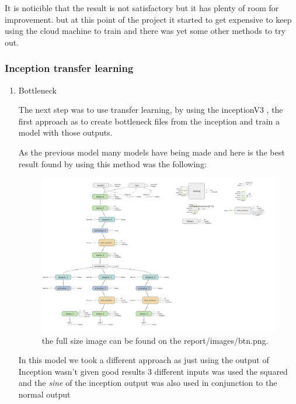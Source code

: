 \documentclass[11pt]{article}
\begin{document}
It is noticible that the result is not satisfactory but it has plenty of room
for improvement. but at this point of the project it started to get expensive
to keep using the cloud machine to train and there was yet some other methods
to try out.  

\subsubsection{Inception transfer learning}
\label{sec:org02e1c9f}

\begin{enumerate}
\item Bottleneck
\label{sec:orgd9edb86}

The next step was to use transfer learning, by using the inceptionV3
\cite{szegedy2016rethinking}, the first approach as to create bottleneck files
from the inception and train a model with those outputs.

As the previous model many models have being made and here is the best result 
found by using this method was the following:

\begin{figure}[htbp]
\centering
\includegraphics[width=.9\linewidth]{./images/btn.png}
\caption{the full size image can be found on the report/images/btn.png.}
\end{figure}

In this model we took a different approach as just using the output of
Inception wasn't given good results 3 different inputs was used the squared
and the \emph{sine} of the inception output was also used in conjunction to the
normal output 


\end{enumerate}
\end{document}
